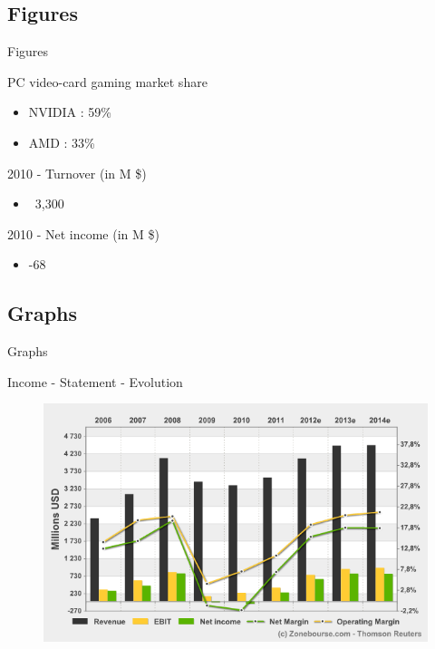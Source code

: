 \documentclass{beamer}
\begin{document}
\subsection{Figures}
\begin{frame}{Figures}
	\transdissolve[duration=0.1] %
	\begin{block}{PC video-card gaming market share}
		\begin{itemize}
			\item<+->{NVIDIA : 59\% }
			\item<+->{AMD : 33\% }
		\end{itemize}
	\end{block}	
	\begin{block}{2010 - Turnover (in M \$)}
		\begin{itemize}
			\item<+->{~3,300}
		\end{itemize}
	\end{block}
	\begin{block}{2010 - Net income (in M \$)}
		\begin{itemize}
			\item<+->{-68}
		\end{itemize}
	\end{block}
\end{frame}

\subsection{Graphs}
\begin{frame}{Graphs}
	\begin{block}{Income - Statement - Evolution}
		\begin{figure}[h]
			\includegraphics[width=0.90\textheight]{./Income_Statement_Evolution.png}
		\end{figure}
	\end{block}	
\end{frame}
\end{document}
